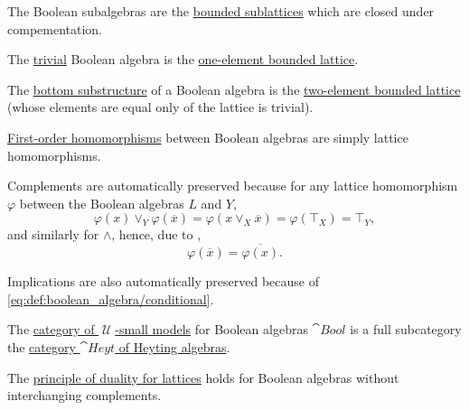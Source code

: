 \begin{definition}
\begin{thmenum}[resume=def:boolean_algebra]
     The Boolean subalgebras are the \hyperref[def:semilattice/submodel]{bounded sublattices} which are closed under compementation.

     The \hyperref[rem:trivial_structure]{trivial} Boolean algebra is the \hyperref[def:semilattice/trivial]{one-element bounded lattice}.

     The \hyperref[thm:substructures_form_complete_lattice/bottom]{bottom substructure} of a Boolean algebra is the \hyperref[def:semilattice/trivial]{two-element bounded lattice} (whose elements are equal only of the lattice is trivial).

     \hyperref[def:first_order_homomorphism]{First-order homomorphisms} between Boolean algebras are simply lattice homomorphisms.

    Complements are automatically preserved because for any lattice homomorphism \( \varphi \) between the Boolean algebras \( L \) and \( Y \),
    \begin{equation*}
      \varphi(x) \vee_Y \varphi(\overline x) = \varphi(x \vee_X \overline x) = \varphi(\top_X) = \top_Y,
    \end{equation*}
    and similarly for \( \wedge \), hence, due to ,
    \begin{equation*}
      \varphi(\overline x) = \overline {\varphi(x)}.
    \end{equation*}

    Implications are also automatically preserved because of \eqref{eq:def:boolean_algebra/conditional}.

     The \hyperref[def:category_of_small_first_order_models]{category of \( \mscrU \)-small models} for Boolean algebras \( \cat{Bool} \) is a full subcategory the \hyperref[def:heyting_algebra/category]{category \( \cat{Heyt} \) of Heyting algebras}.

     The \hyperref[def:semilattice/duality]{principle of duality for lattices} holds for Boolean algebras without interchanging complements.
  \end{thmenum}
\end{definition}

